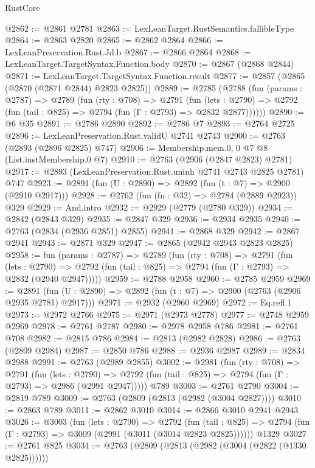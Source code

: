 \begin{lexlean}{RustCore}
\begin{coremodule}
@2862 := @2861 @2781
@2863 := LexLeanTarget.RustSemantics.fallibleType
@2864 := @2863 @2820
@2865 := @2862 @2864
@2866 := LexLeanPreservation.Rust.Jd.b
@2867 := @2866 @2864
@2868 := LexLeanTarget.TargetSyntax.Function.body
@2870 := @2867 (@2868 @2844)
@2871 := LexLeanTarget.TargetSyntax.Function.result
@2877 := @2857 (@2865 (@2870 (@2871 @2844) @2823 @2825))
@2889 := @2785
    (@2788
      (fun (params : @2787) =>
      @2789
        (fun (rty : @708) =>
        @2791
          (fun (lets : @2790) =>
          @2792 (fun (tail : @825) => @2794 (fun (Γ : @2793) => @2832 @2877))))))
@2890 := @6 @35
@2891 := @2786 @2890
@2892 := @2786 @7
@2893 := @2764 @2725
@2896 := LexLeanPreservation.Rust.validU @2741 @2743
@2900 := @2763 (@2893 (@2896 @2825) @747)
@2906 := Membership.mem.{0, 0} @7 @8 (List.instMembership.{0} @7)
@2910 := @2763 (@2906 (@2847 @2823) @2781)
@2917 := @2893 (LexLeanPreservation.Rust.uninh @2741 @2743 @2825 @2781) @747
@2923 := @2891 (fun (U : @2890) => @2892 (fun (t : @7) => @2900 (@2910 @2917)))
@2928 := @2762 (fun (fn : @32) => @2784 (@2889 @2923)) @329
@2929 := And.intro
@2932 := @2929 (@2779 (@2780 @329))
@2934 := @2842 (@2843 @329)
@2935 := @2847 @329
@2936 := @2934 @2935
@2940 := @2763 (@2834 (@2936 @2851) @2855)
@2941 := @2868 @329
@2942 := @2867 @2941
@2943 := @2871 @329
@2947 := @2865 (@2942 @2943 @2823 @2825)
@2958 := fun (params : @2787) =>
  @2789
    (fun (rty : @708) =>
    @2791
      (fun (lets : @2790) =>
      @2792 (fun (tail : @825) => @2794 (fun (Γ : @2793) => @2832 (@2940 @2947)))))
@2959 := @2788 @2958
@2960 := @2785 @2959
@2969 := @2891 (fun (U : @2890) => @2892 (fun (t : @7) => @2900 (@2763 (@2906 @2935 @2781) @2917)))
@2971 := @2932 (@2960 @2969)
@2972 := Eq.refl.{1}
@2973 := @2972 @2766
@2975 := @2971 (@2973 @2778)
@2977 := @2748 @2959 @2969
@2978 := @2761 @2787
@2980 := @2978 @2958 @786
@2981 := @2761 @708
@2982 := @2815 @786
@2984 := @2813 (@2982 @2828)
@2986 := @2763 (@2809 @2984)
@2987 := @2850 @786
@2988 := @2936 @2987
@2989 := @2834 @2988
@2991 := @2763 (@2989 @2855)
@3002 := @2981
    (fun (rty : @708) =>
    @2791
      (fun (lets : @2790) =>
      @2792 (fun (tail : @825) => @2794 (fun (Γ : @2793) => @2986 (@2991 @2947)))))
    @789
@3003 := @2761 @2790
@3004 := @2819 @789
@3009 := @2763 (@2809 (@2813 (@2982 (@3004 @2827))))
@3010 := @2863 @789
@3011 := @2862 @3010
@3014 := @2866 @3010 @2941 @2943
@3026 := @3003
    (fun (lets : @2790) =>
    @2792
      (fun (tail : @825) => @2794 (fun (Γ : @2793) => @3009 (@2991 (@3011 (@3014 @2823 @2825))))))
    @1329
@3027 := @2761 @825
@3034 := @2763 (@2809 (@2813 (@2982 (@3004 (@2822 (@1330 @2825))))))

\end{coremodule}
\end{lexlean}
